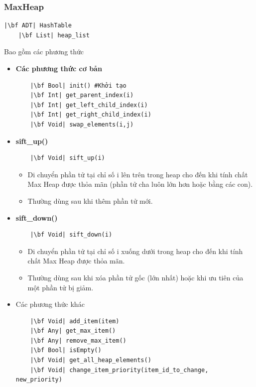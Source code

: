 \subsubsection{MaxHeap}
\begin{verbatim}
|\bf ADT| HashTable
    |\bf List| heap_list
\end{verbatim}
Bao gồm các phương thức
\begin{itemize}
    \item \textbf{Các phương thức cơ bản}
\begin{verbatim}
    |\bf Bool| init() #Khởi tạo
    |\bf Int| get_parent_index(i)
    |\bf Int| get_left_child_index(i)
    |\bf Int| get_right_child_index(i)
    |\bf Void| swap_elements(i,j)
\end{verbatim}
    \item \textbf{sift\_up()}
\begin{verbatim}
    |\bf Void| sift_up(i)
\end{verbatim}
\begin{itemize}
    \item Di chuyển phần tử tại chỉ số i lên trên trong heap cho đến khi tính chất Max Heap được thỏa mãn (phần tử cha luôn lớn hơn hoặc bằng các con).
    \item Thường dùng sau khi thêm phần tử mới.
\end{itemize}
    \item \textbf{sift\_down()}
\begin{verbatim}
    |\bf Void| sift_down(i)
\end{verbatim}
\begin{itemize}
    \item Di chuyển phần tử tại chỉ số i xuống dưới trong heap cho đến khi tính chất Max Heap được thỏa mãn. 
    \item Thường dùng sau khi xóa phần tử gốc (lớn nhất) hoặc khi ưu tiên của một phần tử bị giảm.
\end{itemize}
\item Các phương thức khác
\begin{verbatim}
    |\bf Void| add_item(item)
    |\bf Any| get_max_item()
    |\bf Any| remove_max_item()
    |\bf Bool| isEmpty()
    |\bf Void| get_all_heap_elements()
    |\bf Void| change_item_priority(item_id_to_change, new_priority)
\end{verbatim}
\end{itemize}
